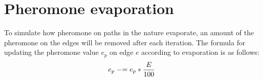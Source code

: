 \section{Pheromone evaporation}
\label{sec:evaporation}
To simulate how pheromone on paths in the nature evaporate, an amount of the pheromone on the edges will be removed after each iteration.
The formula for updating the pheromone value $e_p$ on edge $e$ according to evaporation is as follows: 
\newline
$$e_p \mathrel{-}= e_p*\frac{E}{100}$$
\newline


